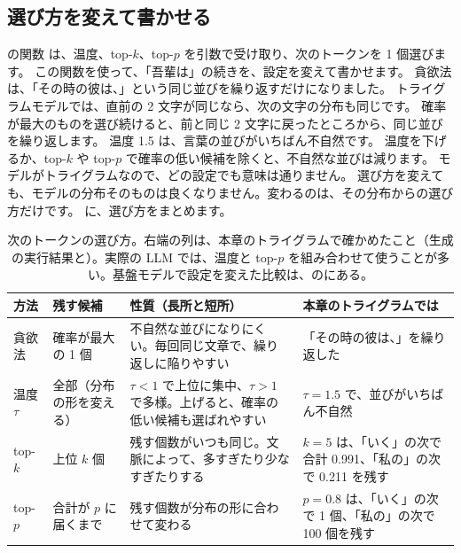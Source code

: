 \subsection*{選び方を変えて書かせる}

の関数  は、温度、top-$k$、top-$p$ を引数で受け取り、次のトークンを 1 個選びます。
この関数を使って、「吾輩は」の続きを、設定を変えて書かせます。
貪欲法は、「その時の彼は、」という同じ並びを繰り返すだけになりました。
トライグラムモデルでは、直前の 2 文字が同じなら、次の文字の分布も同じです。
確率が最大のものを選び続けると、前と同じ 2 文字に戻ったところから、同じ並びを繰り返します。
温度 1.5 は、言葉の並びがいちばん不自然です。
温度を下げるか、top-$k$ や top-$p$ で確率の低い候補を除くと、不自然な並びは減ります。
モデルがトライグラムなので、どの設定でも意味は通りません。
選び方を変えても、モデルの分布そのものは良くなりません。変わるのは、その分布からの選び方だけです。
に、選び方をまとめます。

\begin{table}[tbp]
\centering
\caption{次のトークンの選び方。右端の列は、本章のトライグラムで確かめたこと（生成の実行結果と）。実際の LLM では、温度と top-$p$ を組み合わせて使うことが多い。基盤モデルで設定を変えた比較は、のにある。}
\label{tab:lm-sampling}
\small
\begin{tabularx}{\linewidth}{l>{\raggedright\arraybackslash}p{23mm}>{\raggedright\arraybackslash}X>{\raggedright\arraybackslash}X}
\toprule
方法 & 残す候補 & 性質（長所と短所） & 本章のトライグラムでは \\
\midrule
貪欲法 & 確率が最大の 1 個 & 不自然な並びになりにくい。毎回同じ文章で、繰り返しに陥りやすい & 「その時の彼は、」を繰り返した \\
温度 $\tau$ & 全部（分布の形を変える） & $\tau<1$ で上位に集中、$\tau>1$ で多様。上げると、確率の低い候補も選ばれやすい & $\tau=1.5$ で、並びがいちばん不自然 \\
top-$k$ & 上位 $k$ 個 & 残す個数がいつも同じ。文脈によって、多すぎたり少なすぎたりする & $k=5$ は、「いく」の次で合計 0.991、「私の」の次で 0.211 を残す \\
top-$p$ & 合計が $p$ に届くまで & 残す個数が分布の形に合わせて変わる & $p=0.8$ は、「いく」の次で 1 個、「私の」の次で 100 個を残す \\
\bottomrule
\end{tabularx}
\end{table}

